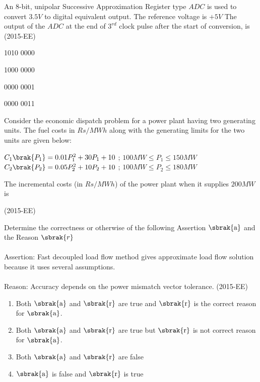  \item An $8$-bit, unipolar Successive Approximation Register type $ADC$
 is used to convert $3.5V$
 to digital equivalent output. The reference voltage is $+5V$
 The output of the $ADC$
 at the end of $3^{rd}$ clock pulse after the start of conversion, is \hfill(2015-EE)
 \begin{enumerate}
     \begin{multicols}{2}
         \item 1010 0000
         \item 1000 0000
         \item 0000 0001
         \item 0000 0011
     \end{multicols}
 \end{enumerate}
 \item Consider the economic dispatch problem for a power plant having two generating units. The fuel costs in $Rs/MWh$ along with the generating limits for the two units are given below: \\
 \begin{center}
     $C_1\brak{P_1} = 0.01P_1^2 + 30P_1 + 10$ ; $100MW \leq P_1 \leq 150MW$ \\
     $C_2\brak{P_2} = 0.05P_2^2 + 10P_2 + 10$ ; $100MW \leq P_2 \leq 180MW$      
 \end{center} 
 
 The incremental costs (in $Rs/MWh$) of the power plant when it supplies $200MW$ is 

 \hfill(2015-EE)
 \item Determine the correctness or otherwise of the following Assertion $\sbrak{\text{a}}$ and the Reason $\sbrak{r}$ \\ \\
 Assertion: Fast decoupled load flow method gives approximate load flow solution because it uses several assumptions. \\ \\
 Reason: Accuracy depends on the power mismatch vector tolerance. \hfill(2015-EE)
 \begin{enumerate}
     \item Both $\sbrak{\text{a}}$ and $\sbrak{\text{r}}$ are true and $\sbrak{\text{r}}$ is the correct reason for $\sbrak{\text{a}}$.
     \item Both $\sbrak{\text{a}}$ and $\sbrak{\text{r}}$ are true but $\sbrak{\text{r}}$ is not correct reason for $\sbrak{\text{a}}$.
     \item Both $\sbrak{\text{a}}$ and $\sbrak{\text{r}}$ are false
     \item $\sbrak{\text{a}}$ is false and $\sbrak{\text{r}}$ is true
 \end{enumerate}
